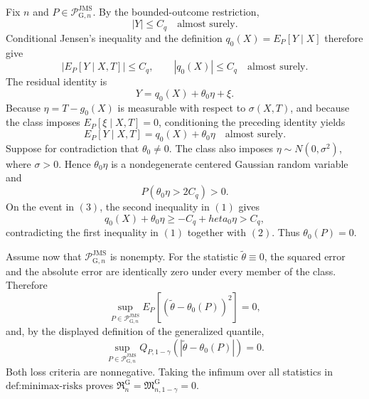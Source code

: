 Fix \(n\) and \(P\in\mathcal P_{\mathrm G,n}^{\mathrm{JMS}}\). By the bounded-outcome restriction,
\[
 |Y|\le C_q\quad\text{almost surely}.
\]
Conditional Jensen's inequality and the definition \(q_0(X)=E_P[Y\mid X]\) therefore give
\[
 \left|E_P[Y\mid X,T]\right|\le C_q,
 \qquad
 |q_0(X)|\le C_q
 \quad\text{almost surely}. \tag{1}
\]
The residual identity is
\[
 Y=q_0(X)+\theta_0\eta+\xi.
\]
Because \(\eta=T-g_0(X)\) is measurable with respect to \(\sigma(X,T)\), and because the class imposes \(E_P[\xi\mid X,T]=0\), conditioning the preceding identity yields
\[
 E_P[Y\mid X,T]=q_0(X)+\theta_0\eta
 \quad\text{almost surely}. \tag{2}
\]
Suppose for contradiction that \(\theta_0\ne0\). The class also imposes \(\eta\sim N(0,\sigma^2)\), where \(\sigma>0\). Hence \(\theta_0\eta\) is a nondegenerate centered Gaussian random variable and
\[
 P(\theta_0\eta>2C_q)>0. \tag{3}
\]
On the event in \((3)\), the second inequality in \((1)\) gives
\[
 q_0(X)+\theta_0\eta
 \ge -C_q+  heta_0\eta
 >C_q,
\]
contradicting the first inequality in \((1)\) together with \((2)\). Thus \(\theta_0(P)=0\).

Assume now that \(\mathcal P_{\mathrm G,n}^{\mathrm{JMS}}\) is nonempty. For the statistic \(\widetilde\theta\equiv0\), the squared error and the absolute error are identically zero under every member of the class. Therefore
\[
 \sup_{P\in\mathcal P_{\mathrm G,n}^{\mathrm{JMS}}}
 E_P[(\widetilde\theta-\theta_0(P))^2]=0,
\]
and, by the displayed definition of the generalized quantile,
\[
 \sup_{P\in\mathcal P_{\mathrm G,n}^{\mathrm{JMS}}}
 Q_{P,1-\gamma}(|\widetilde\theta-\theta_0(P)|)=0.
\]
Both loss criteria are nonnegative. Taking the infimum over all statistics in \(\text{def:minimax-risks}\) proves \(\mathfrak R_n^{\mathrm G}=\mathfrak M_{n,1-\gamma}^{\mathrm G}=0\).